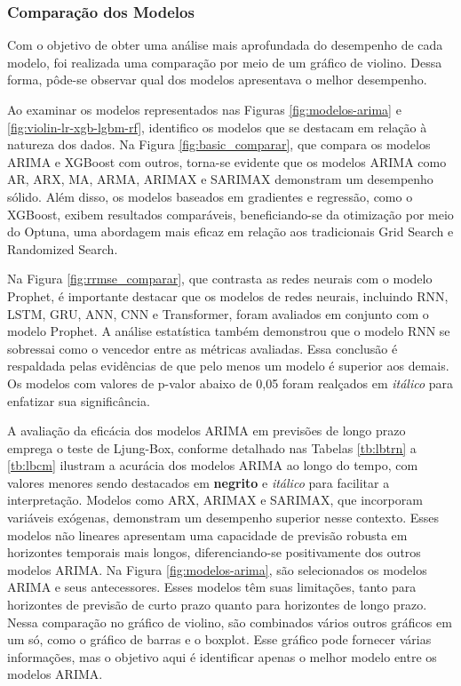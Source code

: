 \subsubsection{Compara\c c\~ao dos Modelos}

Com o objetivo de obter uma análise mais aprofundada do desempenho de cada modelo, foi realizada uma comparação por meio de um gráfico de violino. Dessa forma, pôde-se observar qual dos modelos apresentava o melhor desempenho.



Ao examinar os modelos representados nas Figuras \ref{fig:modelos-arima} e \ref{fig:violin-lr-xgb-lgbm-rf}, identifico os modelos que se destacam em relação à natureza dos dados. Na Figura \ref{fig:basic_comparar}, que compara os modelos ARIMA e XGBoost com outros, torna-se evidente que os modelos ARIMA como AR, ARX, MA, ARMA, ARIMAX e SARIMAX demonstram um desempenho sólido. Além disso, os modelos baseados em gradientes e regressão, como o XGBoost, exibem resultados comparáveis, beneficiando-se da otimização por meio do Optuna, uma abordagem mais eficaz em relação aos tradicionais Grid Search e Randomized Search.

Na Figura \ref{fig:rrmse_comparar}, que contrasta as redes neurais com o modelo Prophet, é importante destacar que os modelos de redes neurais, incluindo RNN, LSTM, GRU, ANN, CNN e Transformer, foram avaliados em conjunto com o modelo Prophet. A análise estatística também demonstrou que o modelo RNN se sobressai como o vencedor entre as métricas avaliadas. Essa conclusão é respaldada pelas evidências de que pelo menos um modelo é superior aos demais. Os modelos com valores de p-valor abaixo de 0,05 foram realçados em \textit{itálico} para enfatizar sua significância.

A avaliação da eficácia dos modelos ARIMA em previsões de longo prazo emprega o teste de Ljung-Box, conforme detalhado nas Tabelas \ref{tb:lbtrn} a \ref{tb:lbcm} ilustram a acurácia dos modelos ARIMA ao longo do tempo, com valores menores sendo destacados em \textbf{negrito} e \textit{itálico} para facilitar a interpretação. Modelos como ARX, ARIMAX e SARIMAX, que incorporam variáveis exógenas, demonstram um desempenho superior nesse contexto. Esses modelos não lineares apresentam uma capacidade de previsão robusta em horizontes temporais mais longos, diferenciando-se positivamente dos outros modelos ARIMA. Na Figura \ref{fig:modelos-arima}, são selecionados os modelos ARIMA e seus antecessores. Esses modelos têm suas limitações, tanto para horizontes de previsão de curto prazo quanto para horizontes de longo prazo. Nessa comparação no gráfico de violino, são combinados vários outros gráficos em um só, como o gráfico de barras e o boxplot. Esse gráfico pode fornecer várias informações, mas o objetivo aqui é identificar apenas o melhor modelo entre os modelos ARIMA.


